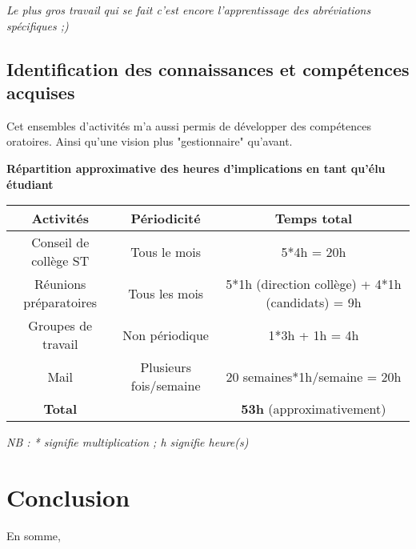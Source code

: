 \documentclass{article}
\begin{document}
\textit{Le plus gros travail qui se fait c'est encore l'apprentissage des abréviations spécifiques ;)}
\subsection{Identification des connaissances et compétences acquises}



Cet ensembles d'activités m'a aussi permis de développer des compétences oratoires. Ainsi qu'une vision plus "gestionnaire" qu'avant.
\newpage
\begin{center}
\textbf{Répartition approximative des heures d'implications en tant qu'élu étudiant}
\vspace*{10pt}

\begin{tabular}{|c|c|c|}
\hline 
\textbf{Activités} & \textbf{Périodicité} & \textbf{Temps total}\\ 
\hline 
Conseil de collège ST & Tous le mois & 5*4h = 20h \\ 
\hline 
Réunions préparatoires & Tous les mois & 5*1h (direction collège) + 4*1h (candidats) = 9h\\ 
\hline 
Groupes de travail & Non périodique & 1*3h + 1h = 4h\\ 
\hline 
Mail & Plusieurs fois/semaine & 20 semaines*1h/semaine = 20h\\ 
\hline 
\textbf{Total} &  & \textbf{53h} (approximativement) \\ 
\hline 
\end{tabular} 
\end{center}
\textit{NB : * signifie multiplication ; h signifie heure(s)}

\section*{Conclusion}
En somme, 
\end{document}
